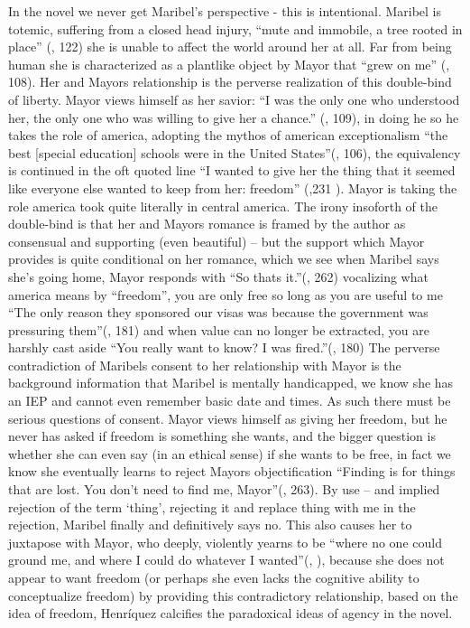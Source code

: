 \documentclass{article}
\begin{document}
In the novel we never get Maribel's perspective - this is intentional. Maribel is totemic, suffering from a closed head injury,  ``mute and immobile, a tree rooted in place'' (\cite{Henriquez2014-sh}, 122) she is unable to affect the world around her at all. Far from being human she is characterized as a plantlike object by Mayor that ``grew on me'' (\cite{Henriquez2014-sh}, 108). Her and Mayors relationship is the perverse realization of this double-bind of liberty. Mayor views himself as her savior: ``I was the only one who understood her, the only one who was willing to give her a chance.'' (\cite{Henriquez2014-sh}, 109), in doing he so he takes the role of america, adopting the mythos of american exceptionalism ``the best [special education] schools were in the United States''(\cite{Henriquez2014-sh}, 106), the equivalency is continued in the oft quoted line ``I wanted to give her the thing that it seemed like everyone else wanted to keep from her: freedom'' (\cite{Henriquez2014-sh},231 ). Mayor is taking the role america took quite literally in central america. The irony insoforth of the double-bind is that her and Mayors romance is framed by the author as consensual and supporting (even beautiful) -- but the support which Mayor provides is quite conditional on her romance, which we see when Maribel says she's going home, Mayor responds with ``So thats it.''(\cite{Henriquez2014-sh}, 262) vocalizing what america means by ``freedom'', you are only free so long as you are useful to me ``The only reason they sponsored our visas was because the government was pressuring them''(\cite{Henriquez2014-sh}, 181) and when value can no longer be extracted, you are harshly cast aside ``You really want to know? I was fired.''(\cite{Henriquez2014-sh}, 180) The perverse contradiction of Maribels consent to her relationship with Mayor is the background information that Maribel is mentally handicapped, we know she has an IEP and cannot even remember basic date and times. As such there must be serious questions of consent. Mayor views himself as giving her freedom, but he never has asked if freedom is something she wants, and the bigger question is whether she can even say (in an ethical sense) if she wants to be free, in fact we know she eventually learns to reject Mayors objectification ``Finding is for things that are lost. You don't need to find me, Mayor''(\cite{Henriquez2014-sh}, 263). By use -- and implied rejection of the term `thing', rejecting it and replace thing with me in the rejection, Maribel finally and definitively says no. This also causes her to juxtapose with Mayor, who deeply, violently yearns to be ``where no one could ground me, and where I could do whatever I wanted''(\cite{Henriquez2014-sh}, ), because she does not appear to want freedom (or perhaps she even lacks the cognitive ability to conceptualize freedom) by providing this contradictory relationship, based on the idea of freedom, Henríquez calcifies the paradoxical ideas of agency in the novel.
\end{document}
